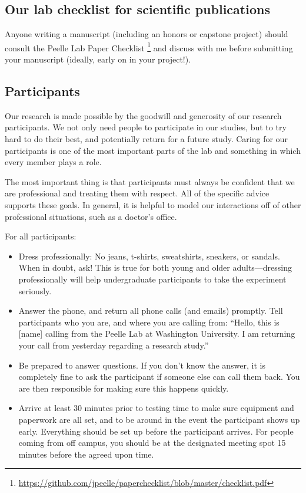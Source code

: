 \documentclass[letterpaper,12pt,oneside]{memoir}
\begin{document}
\subsection{Our lab checklist for scientific publications}

Anyone writing a manuscript (including an honors or capstone project) should consult the Peelle Lab Paper Checklist \footnote{\url{https://github.com/jpeelle/paperchecklist/blob/master/checklist.pdf}} and discuss with me before submitting your manuscript (ideally, early on in your project!).


\subsection{Participants}
\label{sec:participants}

Our research is made possible by the goodwill and generosity of our research participants. We not only need people to participate in our studies, but to try hard to do their best, and potentially return for a future study. Caring for our participants is one of the most important parts of the lab and something in which every member plays a role.

The most important thing is that participants must always be confident that we are professional and treating them with respect. All of the specific advice supports these goals. In general, it is helpful to model our interactions off of other professional situations, such as a doctor's office.

For all participants:

\begin{itemize}

\item Dress professionally: No jeans, t-shirts, sweatshirts, sneakers, or sandals. When in doubt, ask! This is true for both young and older adults---dressing professionally will help undergraduate participants to take the experiment seriously.

\item Answer the phone, and return all phone calls (and emails) promptly. Tell participants who you are, and where you are calling from: ``Hello, this is [name] calling from the Peelle Lab at Washington University. I am returning your call from yesterday regarding a research study.''

\item Be prepared to answer questions. If you don't know the answer, it is completely fine to ask the participant if someone else can call them back. You are then responsible for making sure this happens quickly.

\item Arrive at least 30 minutes prior to testing time to make sure equipment and paperwork are all set, and to be around in the event the participant shows up early. Everything should be set up before the participant arrives. For people coming from off campus, you should be at the designated meeting spot 15 minutes before the agreed upon time.

\end{itemize}
	
\end{document}
